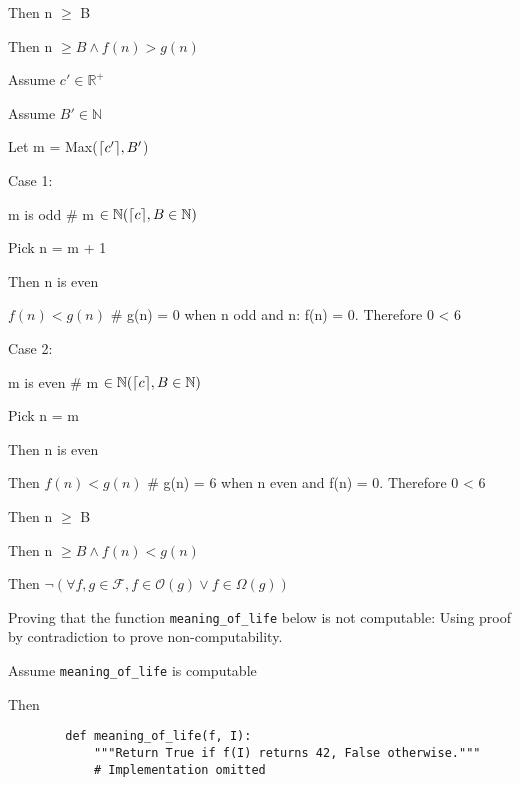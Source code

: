 \documentclass{article}
\DeclarePairedDelimiter\ceil{\lceil}{\rceil}
\begin{document}
\begin{enumerate}
\begin{description}
\begin{description}
\begin{description}
\begin{description}
\begin{description}
					\end {description}
				\end {description}
				\item Then n $\geq$ B 
			\end {description}
		\item Then n $\geq B \wedge f(n) > g(n)$
	\end {description}
	\item Assume $c' \in \mathbb{R}^+$
	\begin{description}
		\item Assume $ B' \in \mathbb{N}$
			\begin{description}
				\item Let m = Max($\ceil*{c'}, B'$)
				\begin{description}
					\item Case 1: 
					\begin{description}
						\item m is odd  \# m $\in \mathbb{N}(\ceil*{c}, B \in \mathbb{N})$
						\item Pick n = m + 1
						\item Then n is even 
						\item $f(n) < g(n)$ \# g(n) = 0 when n odd and n: f(n) = 0. Therefore 0 < 6
					\end {description}
					\item Case 2:
					\begin{description}
						\item m is even \# m $\in \mathbb{N}(\ceil*{c}, B \in \mathbb{N})$
						\item Pick n = m
						\item Then n is even
						\item Then $f(n) < g(n)$ \# g(n) = 6 when n even and f(n) = 0. Therefore 0 <  6
					\end {description}
				\item Then n $\geq$ B 
				\end {description}
		\item Then n $\geq B \wedge f(n) < g(n)$
	\end  {description}
	\item Then $\lnot (\forall f, g\in\mathcal{F}, f\in\mathcal{O}(g) \vee f\in\Omega(g))$
\end{description}
\item Proving that the function \verb+meaning_of_life+ below is not computable:   %
Using proof by contradiction to prove non-computability. 
\begin{description}
	\item Assume  \verb+meaning_of_life+ is computable 
	\begin{description}
		\item Then 
		\begin{verbatim}
		def meaning_of_life(f, I):
		 	"""Return True if f(I) returns 42, False otherwise."""
			# Implementation omitted


\end{verbatim}
\end{description}
\end{description}
\end{description}
\end{enumerate}
\end{document}
